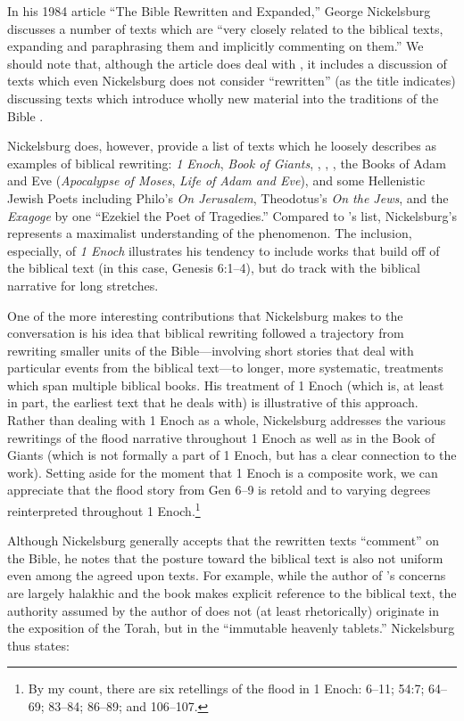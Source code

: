  In his 1984 article ``The Bible Rewritten and Expanded,'' George Nickelsburg discusses a number of texts which are ``very closely related to the biblical texts, expanding and paraphrasing them and implicitly commenting on them.''\autocite[89]{nickelsburg_stone1984} We should note that, although the article does deal with \rwb, it includes a discussion of texts which even Nickelsburg does not consider ``rewritten'' (as the title indicates) discussing texts which introduce wholly new material into the traditions of the Bible \autocite[89--90]{nickelsburg_stone1984}. 

 Nickelsburg does, however, provide a list of texts which he loosely describes as examples of biblical rewriting: \emph{1 Enoch}, \emph{Book of Giants}, \jub, \ga, \ant, the Books of Adam and Eve (\emph{Apocalypse of Moses}, \emph{Life of Adam and Eve}), and some Hellenistic Jewish Poets including Philo's \emph{On Jerusalem}, Theodotus's \emph{On the Jews}, and the \emph{Exagoge} by one ``Ezekiel the Poet of Tragedies.'' Compared to \vermes's list, Nickelsburg's represents a maximalist understanding of the \rwb phenomenon. The inclusion, especially, of \emph{1 Enoch} illustrates his tendency to include works that build off of the biblical text (in this case, Genesis 6:1--4), but do track with the biblical narrative for long stretches. 

 One of the more interesting contributions that Nickelsburg makes to the conversation is his idea that biblical rewriting followed a trajectory from rewriting smaller units of the Bible---involving short stories that deal with particular events from the biblical text---to longer, more systematic, treatments which span multiple biblical books. His treatment of 1 Enoch (which is, at least in part, the earliest text that he deals with) is illustrative of this approach. Rather than dealing with 1 Enoch as a whole, Nickelsburg addresses the various rewritings of the flood narrative throughout 1 Enoch as well as in the Book of Giants (which is not formally a part of 1 Enoch, but has a clear connection to the work). Setting aside for the moment that 1 Enoch is a composite work, we can appreciate that the flood story from Gen 6--9 is retold and to varying degrees reinterpreted throughout 1 Enoch.\footnote{By my count, there   are six retellings of the flood in 1 Enoch: 6--11; 54:7; 64--69;   83--84; 86--89; and 106--107.} 

 Although Nickelsburg generally accepts that the rewritten texts ``comment'' on the Bible, he notes that the posture toward the biblical text is also not uniform even among the agreed upon \rwb texts. For example, while the author of \jub's concerns are largely halakhic and the book makes explicit reference to the biblical text, the authority assumed by the author of \jub does not (at least rhetorically) originate in the exposition of the Torah, but in the ``immutable heavenly tablets.''\autocite[100--101]{nickelsburg_stone1984} Nickelsburg thus states: 

